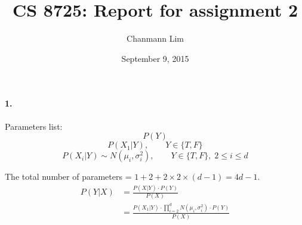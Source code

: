 \documentclass[a4paper]{article}
\begin{document}
\title{CS 8725: Report for assignment 2}
\author{Chanmann Lim}
\date{September 9, 2015}
\maketitle

\paragraph{1.} Parameters list: \\
	$$ P(Y) $$
	$$ P(X_1|Y), \qquad Y \in \{T, F\} $$
	$$ P(X_i|Y) \sim N(\mu_i, \sigma_i^2), \qquad Y \in \{T, F\}, \; 2 \leq i \leq d $$

	The total number of parameters = $1 + 2 + 2 \times 2 \times (d-1) = 4d - 1 $.\\
	\begin{align}
		P(Y|X) &= \frac{P(X|Y) \cdot P(Y)}{P(X)} \\
			&= \frac{P(X_1|Y) \cdot \prod_{i=2}^d N(\mu_i, \sigma_i^2) \cdot P(Y)}{P(X)}
	\end{align} 
\end{document}

